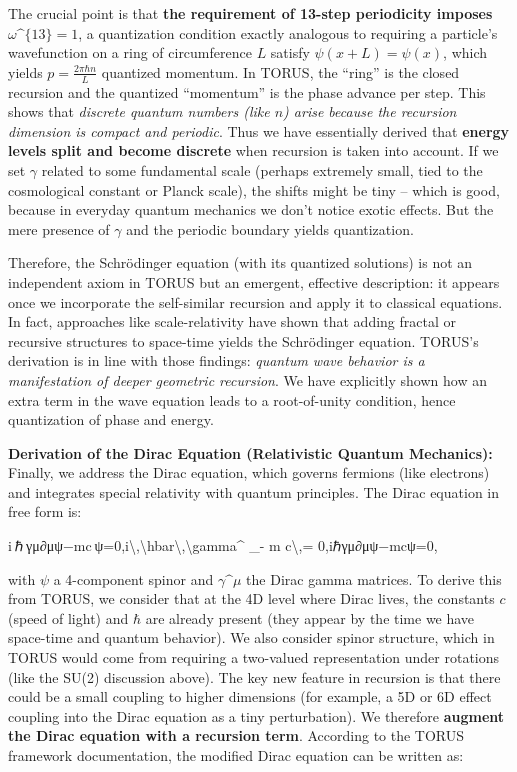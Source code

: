 \documentclass[]{article}
\begin{document}
The crucial point is that \textbf{the requirement of 13-step periodicity
imposes $\omega\^{}\{13\}=1$}, a quantization condition
exactly analogous to requiring a particle's wavefunction on a ring of
circumference $L$ satisfy $\psi(x+L) =
\psi(x)$, which yields $p =
\frac{2\pi \hbar n}{L}$ quantized momentum​. In
TORUS, the ``ring'' is the closed recursion and the quantized
``momentum'' is the phase advance per step. This shows that \emph{discrete quantum numbers (like $n$) arise
because the recursion dimension is compact and periodic}. Thus we have
essentially derived that \textbf{energy levels split and become
discrete} when recursion is taken into account​. If we set
$\gamma$ related to some fundamental scale (perhaps
extremely small, tied to the cosmological constant or Planck scale), the
shifts might be tiny -- which is good, because in everyday quantum
mechanics we don't notice exotic effects. But the mere presence of
$\gamma$ and the periodic boundary yields quantization.

Therefore, the Schrödinger equation (with its quantized solutions) is
not an independent axiom in TORUS but an emergent, effective
description: it appears once we incorporate the self-similar recursion
and apply it to classical equations​. In fact, approaches like
scale-relativity have shown that adding fractal or recursive structures
to space-time yields the Schrödinger equation​. TORUS's derivation is in
line with those findings: \emph{quantum wave behavior is a manifestation
of deeper geometric recursion}. We have explicitly shown how an extra
term in the wave equation leads to a root-of-unity condition, hence
quantization of phase and energy.

\textbf{Derivation of the Dirac Equation (Relativistic Quantum
Mechanics):} Finally, we address the Dirac equation, which governs
fermions (like electrons) and integrates special relativity with quantum
principles. The Dirac equation in free form is:

i ℏ γμ∂μψ−mc ψ=0,i\textbackslash{},\textbackslash{}hbar\textbackslash{},\textbackslash{}gamma\^{}\mu
\partial\_\mu \psi - m
c\textbackslash{},\psi = 0,iℏγμ∂μ​ψ−mcψ=0,

with $\psi$ a 4-component spinor and
$\gamma\^{}\mu$ the Dirac gamma
matrices. To derive this from TORUS, we consider that at the 4D level
where Dirac lives, the constants $c$ (speed of light) and
$\hbar$ are already present (they appear by the time we
have space-time and quantum behavior). We also consider spinor
structure, which in TORUS would come from requiring a two-valued
representation under rotations (like the SU(2) discussion above). The
key new feature in recursion is that there could be a small coupling to
higher dimensions (for example, a 5D or 6D effect coupling into the
Dirac equation as a tiny perturbation). We therefore \textbf{augment the
Dirac equation with a recursion term}. According to the TORUS framework
documentation, the modified Dirac equation can be written as​:
\end{document}
